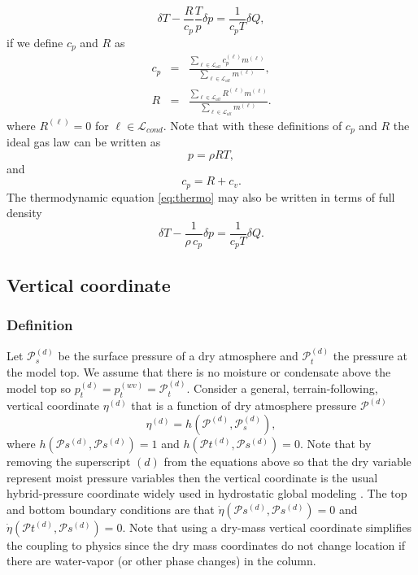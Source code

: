\documentclass{agujournal}
\begin{document}
\begin{equation}
\delta T-\frac{R}{c_p}\frac{T}{p}\delta p=\frac{1}{c_p T}\delta Q\label{eq:thermo},
\end{equation}
if we define $c_p$ and $R$ as
\begin{eqnarray}
c_p&=&\frac{\sum_{\ell \in \mathcal{L}_{all}} c_p^{(\ell)}m^{(\ell)}}{\sum_{\ell \in \mathcal{L}_{all}} m^{(\ell)}},\label{eq:cp} \\
R  &=&\frac{\sum_{\ell \in \mathcal{L}_{all}} R^{(\ell)} m^{(\ell)}}{\sum_{\ell \in \mathcal{L}_{all}} m^{(\ell)}}.
\end{eqnarray}
where $R^{(\ell)}=0$ for $\ell \in \mathcal{L}_{cond}$. Note that with these definitions of $c_p$ and $R$ the ideal gas law can be written as
\begin{equation}
p=\rho R T,\label{eq:ig4}
\end{equation}
and 
\begin{equation}
c_p=R+c_v.
\end{equation}
The thermodynamic equation \eqref{eq:thermo} may also be written in terms of full density
\begin{equation}
\delta T-\frac{1}{\rho\, c_p}\delta p=\frac{1}{c_p T}\delta Q\label{eq:thermo2}.
\end{equation}
%
\subsection{Vertical coordinate}\label{eq:vertical_coord}
\subsubsection{Definition}
Let $\mathcal{P}^{(d)}_s$ be the surface pressure of a dry atmosphere  and $\mathcal{P}_t^{(d)}$ the pressure at the model top. We assume that there is no moisture or condensate above the model top so $p_t^{(d)}=p_t^{(wv)}=\mathcal{P}_t^{(d)}$. Consider a general, terrain-following, vertical coordinate $\eta^{(d)}$ that is a function of dry atmosphere pressure $\mathcal{P}^{(d)}$ 
\begin{equation}
\eta^{(d)}=h(\mathcal{P}^{(d)},\mathcal{P}_s^{(d)}),
\end{equation}
where $h(\mathcal{P}s^{(d)},\mathcal{P}s^{(d)})=1$ and $h(\mathcal{P}t^{(d)},\mathcal{P}s^{(d)})=0$. Note that by removing the superscript $(d)$ from the equations above so that the dry variable represent moist pressure variables then the vertical coordinate is the usual hybrid-pressure coordinate widely used in hydrostatic global modeling \citep{SB1981MWR}. The top and bottom boundary conditions are that $\dot{\eta}\left({\mathcal{P}s^{(d)},\mathcal{P}s^{(d)}}\right)=0$ and $\dot{\eta}\left( \mathcal{P}t^{(d)},\mathcal{P}s^{(d)}\right)=0$. Note that using a dry-mass vertical coordinate simplifies the coupling to physics since the dry mass coordinates do not change location if there are water-vapor (or other phase changes) in the column.
\end{document}

